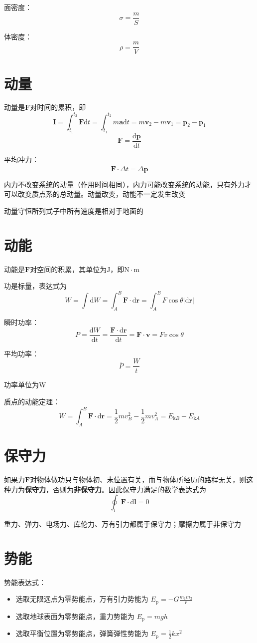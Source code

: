 \documentclass[12pt, a4paper, twoside]{ctexbook}
\begin{document}
{\sonti 面密度}：
$$
\sigma=\frac{m}{S}
$$

{\sonti 体密度}：
$$
\rho=\frac{m}{V}
$$
\section{动量}
{\sonti 动量}是$\boldsymbol{F}$对时间的累积，即
$$
\boldsymbol{I}=\int_{t_1}^{t_2}\boldsymbol{F}\mathrm{d}t=\int_{t_1}^{t_2}m\boldsymbol{a}\mathrm{d}t=m\boldsymbol{v}_2-m\boldsymbol{v}_1=\boldsymbol{p}_2-\boldsymbol{p}_1
$$
$$
\boldsymbol{F}=\frac{\mathrm{d}\boldsymbol{p}}{\mathrm{d}t}
$$

{\sonti 平均冲力}：
$$
\overline{\boldsymbol{F}}\cdot\Delta t=\Delta\boldsymbol{p}
$$

内力不改变系统的动量（作用时间相同），内力可能改变系统的动能，只有外力才可以改变质点系的总动量。动量改变，动能不一定发生改变

动量守恒所列式子中所有速度是相对于地面的
\section{动能}
{\sonti 动能}是$\boldsymbol{F}$对空间的积累，其单位为$\mathrm{J}$，即$\mathrm{N}\cdot\mathrm{m}$

功是标量，表达式为
$$
W=\int\mathrm{d}W=\int_{A}^{B}\boldsymbol{F}\cdot\mathrm{d}\boldsymbol{r}=\int_{A}^{B}F\cos\theta\left|\mathrm{d}\boldsymbol{r}\right|
$$

{\sonti 瞬时功率}：
$$
P=\frac{\mathrm{d}W}{\mathrm{d}t}=\frac{\boldsymbol{F}\cdot\mathrm{d}\boldsymbol{r}}{\mathrm{d}t}=\boldsymbol{F}\cdot\boldsymbol{v}=Fv\cos\theta
$$

{\sonti 平均功率}：
$$
\overline{P}=\frac{W}{t}
$$

功率单位为$\mathrm{W}$

{\sonti 质点的动能定理}：
$$
W=\int_{A}^{B}\boldsymbol{F}\cdot\mathrm{d}\boldsymbol{r}=\frac{1}{2}mv_B^2-\frac{1}{2}mv_A^2=E_{\mathrm{k}B}-E_{\mathrm{k}A}
$$
\section{保守力}
如果力$\boldsymbol{F}$对物体做功只与物体初、末位置有关，而与物体所经历的路程无关，则这种力为\textbf{保守力}，否则为\textbf{非保守力}。因此保守力满足的数学表达式为
$$
\oint_l\boldsymbol{F}\cdot\mathrm{d}\boldsymbol{l}=0
$$

重力、弹力、电场力、库伦力、万有引力都属于保守力；摩擦力属于非保守力
\section{势能}
{\sonti 势能表达式}：
\begin{itemize}
    \item 选取无限远点为零势能点，万有引力势能为
    $E_\mathrm{p}=-G\frac{m_1m_2}{r}$
    \item 选取地球表面为零势能点，重力势能为
    $E_\mathrm{p}=mgh$
    \item 选取平衡位置为零势能点，弹簧弹性势能为
    $E_\mathrm{p}=\frac{1}{2}kx^2$
\end{itemize}
\end{document}
